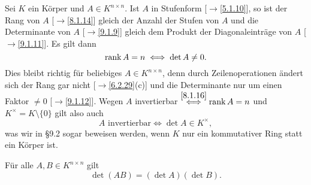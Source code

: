 \documentclass[../../main.tex]{subfiles}
\begin{document}
\begin{bem}\label{9.1.14}
Sei $K$ ein Körper und $A\in K^{n\times n}$. Ist $A$ in Stufenform [$\to$\ref{5.1.10}], so ist der Rang von $A$ [$\to$\ref{8.1.14}] gleich der Anzahl der Stufen von $A$ und die Determinante
von $A$ [$\to$\ref{9.1.9}] gleich dem Produkt der Diagonaleinträge von $A$ [$\to$\ref{9.1.11}].
Es gilt dann
\[\operatorname{rank} A=n\iff\det A\ne0.\]
Dies bleibt richtig für beliebiges $A\in K^{n\times n}$, denn durch Zeilenoperationen ändert sich der Rang gar nicht [$\to$\ref{6.2.29}(c)] und die Determinante nur um einen Faktor
$\ne0$ [$\to$\ref{9.1.12}]. Wegen $A$ invertierbar $\overset{\ref{8.1.16}}\iff\operatorname{rank} A=n$ und $K^\times=K\setminus\{0\}$ gilt also auch
\[A\text{ invertierbar}\iff\det A\in K^\times,\]
was wir in §9.2 sogar beweisen werden, wenn $K$ nur ein kommutativer Ring statt ein Körper ist.
\end{bem}

\begin{sat}[Determinantenproduktsatz]\label{9.1.15}
Für alle $A,B\in K^{n\times n}$ gilt \[\det(AB)=(\det A)(\det B).\]
\end{sat}
\end{document}
